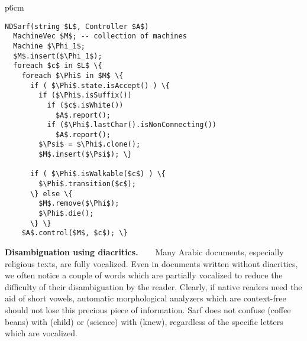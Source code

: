 \documentclass[11pt]{article}
\begin{document}
\begin{table}[tb]
\begin{tabular} {p{6cm}}
\begin{Verbatim}[fontsize=\relsize{-2},
frame=topline,framesep=4mm,label=\fbox{NDSarf algorithm},
commandchars=\\\{\}, codes={\catcode`$=3\catcode`_=8}]
NDSarf(string $L$, Controller $A$) 
  MachineVec $M$; -- collection of machines
  Machine $\Phi_1$;
  $M$.insert($\Phi_1$);
  foreach $c$ in $L$ \{
    foreach $\Phi$ in $M$ \{
      if ( $\Phi$.state.isAccept() ) \{
        if ($\Phi$.isSuffix())
          if ($c$.isWhite())  
            $A$.report();
          if ($\Phi$.lastChar().isNonConnecting())
            $A$.report();
        $\Psi$ = $\Phi$.clone();
        $M$.insert($\Psi$); \}

      if ( $\Phi$.isWalkable($c$) ) \{
        $\Phi$.transition($c$);
      \} else \{
        $M$.remove($\Phi$);
        $\Phi$.die();
      \} \} 
    $A$.control($M$, $c$); \}
\end{Verbatim}
\end{tabular}
\label{a:ndsarf}
\end{table}

{\bf Disambiguation using diacritics.~~~}
Many Arabic documents, especially religious texts, are fully vocalized.
Even in documents written without diacritics, we often %
notice 
a couple of words which are partially vocalized
to reduce the difficulty of their disambiguation by the reader. Clearly, if native readers
need the aid of short vowels, automatic morphological analyzers which are context-free should not lose this precious piece of information.
Sarf does not confuse  (coffee beans) with  (child)
or  (science) with  (knew), regardless of the specific letters which are vocalized.

\end{document}
